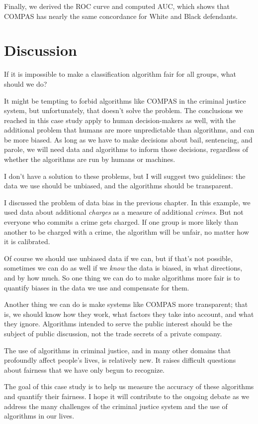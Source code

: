Finally, we derived the ROC curve and computed AUC, which shows that
COMPAS has nearly the same concordance for White and Black defendants.

\section{Discussion}\label{discussion}

If it is impossible to make a classification algorithm fair for all
groups, what should we do?

It might be tempting to forbid algorithms like COMPAS in the criminal
justice system, but unfortunately, that doesn't solve the problem. The
conclusions we reached in this case study apply to human decision-makers
as well, with the additional problem that humans are more unpredictable
than algorithms, and can be more biased. As long as we have to make
decisions about bail, sentencing, and parole, we will need data and
algorithms to inform those decisions, regardless of whether the
algorithms are run by humans or machines.

I don't have a solution to these problems, but I will suggest two
guidelines: the data we use should be unbiased, and the algorithms
should be transparent.

I discussed the problem of data bias in the previous chapter. In this
example, we used data about additional \emph{charges} as a measure of
additional \emph{crimes}. But not everyone who commits a crime gets
charged. If one group is more likely than another to be charged with a
crime, the algorithm will be unfair, no matter how it is calibrated.

Of course we should use unbiased data if we can, but if that's not
possible, sometimes we can do as well if we \emph{know} the data is
biased, in what directions, and by how much. So one thing we can do to
make algorithms more fair is to quantify biases in the data we use and
compensate for them.

Another thing we can do is make systems like COMPAS more transparent;
that is, we should know how they work, what factors they take into
account, and what they ignore. Algorithms intended to serve the public
interest should be the subject of public discussion, not the trade
secrets of a private company.

The use of algorithms in criminal justice, and in many other domains
that profoundly affect people's lives, is relatively new. It raises
difficult questions about fairness that we have only begun to recognize.

The goal of this case study is to help us measure the accuracy of these
algorithms and quantify their fairness. I hope it will contribute to the
ongoing debate as we address the many challenges of the criminal justice
system and the use of algorithms in our lives.

